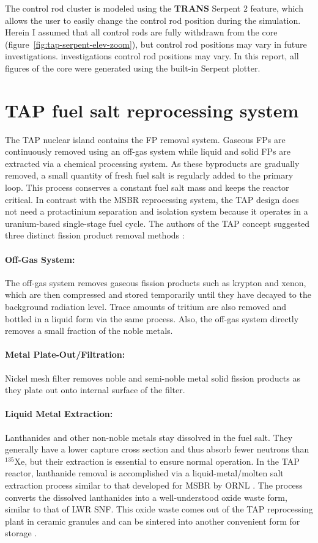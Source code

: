 The control rod cluster is modeled using the \textbf{TRANS} Serpent 2 feature, 
which allows the user to easily change the control rod position during the 
simulation. Herein I assumed that all control rods are fully withdrawn from 
the core (figure~\ref{fig:tap-serpent-elev-zoom}), but control rod 
positions may vary in future investigations.
investigations control rod positions may vary. In this report, all figures of 
the core were generated using the built-in Serpent plotter.

\section{TAP fuel salt reprocessing system}
The \gls{TAP} nuclear island contains the \gls{FP} removal system. Gaseous  
\glspl{FP} are continuously removed using an off-gas system while liquid and 
solid \glspl{FP} are extracted via a chemical processing system. As these 
byproducts are gradually removed, a small quantity of fresh fuel salt is 
regularly added to the primary loop. This process conserves a constant fuel 
salt mass and keeps the reactor critical. In contrast with the \gls{MSBR} 
reprocessing system, the \gls{TAP} design does not need a protactinium 
separation and isolation system because it operates in a uranium-based 
single-stage fuel cycle. The authors of the \gls{TAP} concept suggested three 
distinct fission product removal methods 
\cite{transatomic_power_corporation_neutronics_2016}:
\paragraph{Off-Gas System:} The off-gas system removes gaseous fission 
products such as krypton and xenon, which are then compressed and stored 
temporarily until they have decayed to the background radiation level. Trace 
amounts of tritium are also removed and bottled in a liquid form via the same 
process. Also, the off-gas system directly removes a small fraction of the 
noble metals.
\paragraph{Metal Plate-Out/Filtration:} Nickel mesh filter removes noble and 
semi-noble metal solid fission products as they plate out onto internal surface
of the filter.
\paragraph{Liquid Metal Extraction:} Lanthanides and other non-noble metals 
stay dissolved in the fuel salt. They generally have a lower capture cross 
section and thus absorb fewer neutrons than $^{135}$Xe, but their extraction 
is essential to ensure normal operation. In the \gls{TAP} reactor, lanthanide 
removal is accomplished via a liquid-metal/molten salt extraction process 
similar to that developed for \gls{MSBR} by \gls{ORNL}  
\cite{robertson_conceptual_1971}. The process converts the dissolved 
lanthanides into a well-understood oxide waste form, similar to that of 
\gls{LWR} \gls{SNF}. This oxide waste comes out of the \gls{TAP} reprocessing 
plant in ceramic granules and can be sintered into another convenient form for 
storage \cite{transatomic_power_corporation_technical_2016}.

